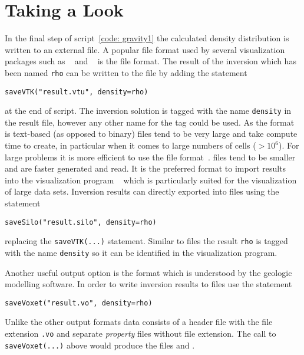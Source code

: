 \section{Taking a Look}
In the final step of script~\ref{code: gravity1} the calculated density
distribution is written to an external file.
A popular file format used by several visualization packages such as
\VisIt~\cite{VISIT} and \mayavi~\cite{MAYAVI} is the \VTK file format.
The result of the inversion which has been named \verb|rho| can be written to
the file  by adding the statement
\begin{verbatim}
saveVTK("result.vtu", density=rho)
\end{verbatim}
at the end of script.
The inversion solution is tagged with the name \verb|density| in the result
file, however any other name for the tag could be used.
As the format is text-based (as opposed to binary) \VTK files tend to be very
large and take compute time to create, in particular when it comes to large
numbers of cells ($>10^6$).
For large problems it is more efficient to use the \SILO file format~\cite{SILO}.
\SILO files tend to be smaller and are faster generated and read.
It is the preferred format to import results into the visualization program
\VisIt~\cite{VISIT} which is particularly suited for the visualization of
large data sets.
Inversion results can directly exported into \SILO files using the statement
\begin{verbatim}
saveSilo("result.silo", density=rho)
\end{verbatim}
replacing the \verb|saveVTK(...)| statement.
Similar to \VTK files the result \verb|rho| is tagged with the name
\verb|density| so it can be identified in the visualization program.

Another useful output option is the \Voxet format which is understood by the
\GOCAD\cite{GOCAD} geologic modelling software.
In order to write inversion results to \Voxet files use the statement
\begin{verbatim}
saveVoxet("result.vo", density=rho)
\end{verbatim}
Unlike the other output formats \Voxet data consists of a header file with the
file extension \verb|.vo| and separate \emph{property} files without file
extension. The call to \verb|saveVoxet(...)| above would produce the files
 and .

